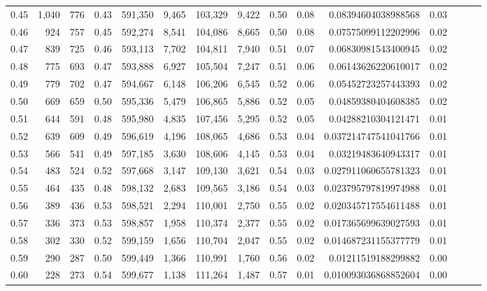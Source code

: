 \begin{tabular}{rrrrrrrrrrrrrrr}
0.45 &   1,040 &    776 &  0.43 &  591,350 &    9,465 &  103,329 &    9,422 &  0.50 &  0.08 &     0.08394604038988568 &      0.03 \\
0.46 &     924 &    757 &  0.45 &  592,274 &    8,541 &  104,086 &    8,665 &  0.50 &  0.08 &     0.07575099112202996 &      0.02 \\
0.47 &     839 &    725 &  0.46 &  593,113 &    7,702 &  104,811 &    7,940 &  0.51 &  0.07 &     0.06830981543400945 &      0.02 \\
0.48 &     775 &    693 &  0.47 &  593,888 &    6,927 &  105,504 &    7,247 &  0.51 &  0.06 &     0.06143626220610017 &      0.02 \\
0.49 &     779 &    702 &  0.47 &  594,667 &    6,148 &  106,206 &    6,545 &  0.52 &  0.06 &     0.05452723257443393 &      0.02 \\
0.50 &     669 &    659 &  0.50 &  595,336 &    5,479 &  106,865 &    5,886 &  0.52 &  0.05 &     0.04859380404608385 &      0.02 \\
0.51 &     644 &    591 &  0.48 &  595,980 &    4,835 &  107,456 &    5,295 &  0.52 &  0.05 &     0.04288210304121471 &      0.01 \\
0.52 &     639 &    609 &  0.49 &  596,619 &    4,196 &  108,065 &    4,686 &  0.53 &  0.04 &    0.037214747541041766 &      0.01 \\
0.53 &     566 &    541 &  0.49 &  597,185 &    3,630 &  108,606 &    4,145 &  0.53 &  0.04 &     0.03219483640943317 &      0.01 \\
0.54 &     483 &    524 &  0.52 &  597,668 &    3,147 &  109,130 &    3,621 &  0.54 &  0.03 &    0.027911060655781323 &      0.01 \\
0.55 &     464 &    435 &  0.48 &  598,132 &    2,683 &  109,565 &    3,186 &  0.54 &  0.03 &    0.023795797819974988 &      0.01 \\
0.56 &     389 &    436 &  0.53 &  598,521 &    2,294 &  110,001 &    2,750 &  0.55 &  0.02 &    0.020345717554611488 &      0.01 \\
0.57 &     336 &    373 &  0.53 &  598,857 &    1,958 &  110,374 &    2,377 &  0.55 &  0.02 &    0.017365699639027593 &      0.01 \\
0.58 &     302 &    330 &  0.52 &  599,159 &    1,656 &  110,704 &    2,047 &  0.55 &  0.02 &    0.014687231155377779 &      0.01 \\
0.59 &     290 &    287 &  0.50 &  599,449 &    1,366 &  110,991 &    1,760 &  0.56 &  0.02 &     0.01211519188299882 &      0.00 \\
0.60 &     228 &    273 &  0.54 &  599,677 &    1,138 &  111,264 &    1,487 &  0.57 &  0.01 &    0.010093036868852604 &      0.00 \\

\end{tabular}
